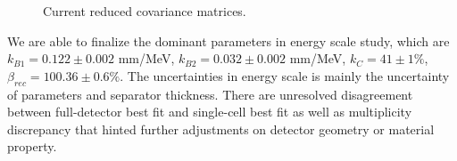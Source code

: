 \begin{figure}[h!]
\centering
{} \quad
{} \quad
\caption{Current reduced covariance matrices.}
\label{fig:cov}
\end{figure}


We are able to finalize the dominant parameters in energy scale study, which are $k_{B1} = 0.122 \pm 0.002$ mm/MeV, $k_{B2} = 0.032 \pm 0.002$ mm/MeV, $k_C = 41 \pm 1\%$, $\beta_{rec} = 100.36\pm0.6\%$.
The uncertainties in energy scale is mainly the uncertainty of parameters and separator thickness.
There are unresolved disagreement between full-detector best fit and single-cell best fit as well as multiplicity discrepancy that hinted further adjustments on detector geometry or material property.












